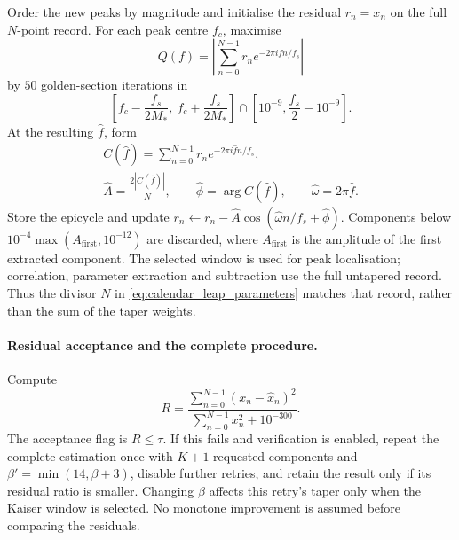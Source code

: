 Order the new peaks by magnitude and initialise the residual \(r_n=x_n\) on the full \(N\)-point record. For each peak centre \(f_c\), maximise
\[
Q(f)=\left|\sum_{n=0}^{N-1}r_n e^{-2\pi i f n/f_s}\right|
\]
by \(50\) golden-section iterations in
\[
\left[f_c-\frac{f_s}{2M_*},\ f_c+\frac{f_s}{2M_*}\right]
\cap\left[10^{-9},\frac{f_s}{2}-10^{-9}\right].
\]
At the resulting \(\widehat f\), form
\begin{equation}\label{eq:calendar_leap_parameters}
\begin{gathered}
C(\widehat f)=\sum_{n=0}^{N-1}r_n e^{-2\pi i\widehat f n/f_s},\\
\widehat A=\frac{2|C(\widehat f)|}{N},\qquad
\widehat\phi=\arg C(\widehat f),\qquad
\widehat\omega=2\pi\widehat f.
\end{gathered}
\end{equation}
Store the epicycle and update \(r_n\leftarrow r_n-\widehat A\cos(\widehat\omega n/f_s+\widehat\phi)\). Components below \(10^{-4}\max(A_{\mathrm{first}},10^{-12})\) are discarded, where \(A_{\mathrm{first}}\) is the amplitude of the first extracted component. The selected window is used for peak localisation; correlation, parameter extraction and subtraction use the full untapered record. Thus the divisor \(N\) in \cref{eq:calendar_leap_parameters} matches that record, rather than the sum of the taper weights.

\paragraph{Residual acceptance and the complete procedure.}
Compute
\begin{equation}\label{eq:calendar_leap_residual}
R=\frac{\sum_{n=0}^{N-1}(x_n-\widehat x_n)^2}
        {\sum_{n=0}^{N-1}x_n^2+10^{-300}}.
\end{equation}
The acceptance flag is \(R\le\tau\). If this fails and verification is enabled, repeat the complete estimation once with \(K+1\) requested components and \(\beta'=\min(14,\beta+3)\), disable further retries, and retain the result only if its residual ratio is smaller. Changing \(\beta\) affects this retry's taper only when the Kaiser window is selected. No monotone improvement is assumed before comparing the residuals.

